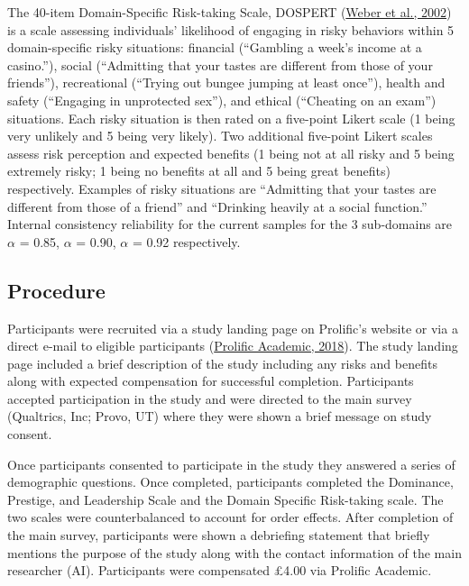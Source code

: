 \documentclass[
  donotrepeattitle,doc, 12pt, a4paper,floatsintext]{apa7}
\begin{document}
The 40-item Domain-Specific Risk-taking Scale, DOSPERT (\protect\hyperlink{ref-weber2002}{Weber et al., 2002}) is a scale assessing individuals' likelihood of engaging in risky behaviors within 5 domain-specific risky situations: financial (``Gambling a week's income at a casino.''), social (``Admitting that your tastes are different from those of your friends''), recreational (``Trying out bungee jumping at least once''), health and safety (``Engaging in unprotected sex''), and ethical (``Cheating on an exam'') situations. Each risky situation is then rated on a five-point Likert scale (1 being very unlikely and 5 being very likely). Two additional five-point Likert scales assess risk perception and expected benefits (1 being not at all risky and 5 being extremely risky; 1 being no benefits at all and 5 being great benefits) respectively. Examples of risky situations are ``Admitting that your tastes are different from those of a friend'' and ``Drinking heavily at a social function.'' Internal consistency reliability for the current samples for the 3 sub-domains are \(\alpha\) = 0.85, \(\alpha\) = 0.90, \(\alpha\) = 0.92 respectively.

\hypertarget{procedure}{%
\subsection{Procedure}\label{procedure}}

Participants were recruited via a study landing page on Prolific's website or via a direct e-mail to eligible participants (\protect\hyperlink{ref-prolificacademic2018}{Prolific Academic, 2018}). The study landing page included a brief description of the study including any risks and benefits along with expected compensation for successful completion. Participants accepted participation in the study and were directed to the main survey (Qualtrics, Inc; Provo, UT) where they were shown a brief message on study consent.

Once participants consented to participate in the study they answered a series of demographic questions. Once completed, participants completed the Dominance, Prestige, and Leadership Scale and the Domain Specific Risk-taking scale. The two scales were counterbalanced to account for order effects. After completion of the main survey, participants were shown a debriefing statement that briefly mentions the purpose of the study along with the contact information of the main researcher (AI). Participants were compensated £4.00 via Prolific Academic.
\end{document}
